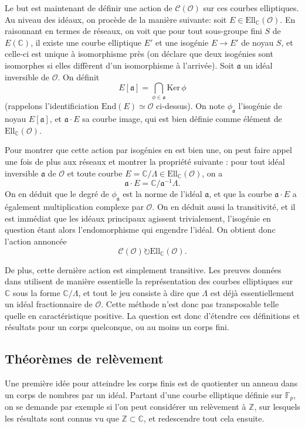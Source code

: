 \documentclass[11pt,a4paper]{article}
\newcommand{\Z}{\mathbb{Z}}
\newcommand{\C}{\mathbb{C}}
\newcommand{\F}{\mathbb{F}}
\renewcommand{\O}{\mathcal{O}}
\newcommand{\Cl}{\mathcal{C}}
\newcommand{\vers}{\longrightarrow}
\newcommand{\End}{\mathrm{End}}
\newcommand{\Ell}{\mathrm{Ell}}
\renewcommand{\frak}{\mathfrak}
\renewcommand{\v}{\vspace{5mm}}
\theoremstyle{definition}
\begin{document}
Le but est maintenant de définir une action de $\Cl(\O)$ sur ces courbes elliptiques. Au niveau des idéaux, on procède de la manière suivante: soit $E\in \Ell_\C(\O)$. En raisonnant en termes de réseaux, on voit que pour tout sous-groupe fini $S$ de $E(\C)$, il existe une courbe elliptique $E'$ et une isogénie $E\vers E'$ de noyau $S$, et celle-ci est unique à isomorphisme près (on déclare que deux isogénies sont isomorphes si elles diffèrent d'un isomorphisme à l'arrivée). Soit $\frak a$ un idéal inversible de $\O$. On définit
$$E[\frak a]=\bigcap_{\phi\in \frak a} \mathrm{Ker}\,\phi$$
(rappelons l'identificiation $\End(E)\simeq\O$ ci-dessus). On note $\phi_{\frak a}$ l'isogénie de noyau $E[\frak a]$, et $\frak a\cdot E$ sa courbe image, qui est bien définie comme élément de $\Ell_\C(\O)$.

\v

Pour montrer que cette action par isogénies en est bien une, on peut faire appel une fois de plus aux réseaux et montrer la propriété suivante : pour tout idéal inversible $\frak a$ de $\O$ et toute courbe $E=\C/\Lambda\in \Ell_\C(\O)$, on a
$$\frak a\cdot E = \C/\frak a^{-1} \Lambda.$$
On en déduit que le degré de $\phi_{\frak a}$ est la norme de l'idéal $\frak a$, et que la courbe $\frak a\cdot E$ a également multiplication complexe par $\O$. On en déduit aussi la transitivité, et il est immédiat que les idéaux principaux agissent trivialement, l'isogénie en question étant alors l'endomorphisme qui engendre l'idéal. On obtient donc l'action annoncée
$$\Cl(\O) \circlearrowright \Ell_\C(\O).$$

De plus, cette dernière action est simplement transitive. Les preuves données dans \cite{Sil2} utilisent de manière essentielle la représentation des courbes elliptiques sur $\C$ sous la forme $\C/\Lambda$, et tout le jeu consiste à dire que $\Lambda$ est déjà essentiellement un idéal fractionnaire de $\O$. Cette méthode n'est donc pas transposable telle quelle en caractéristique positive. La question est donc d'étendre ces définitions et résultats pour un corps quelconque, ou au moins un corps fini.

\subsection{Théorèmes de relèvement}

Une première idée pour atteindre les corps finis est de quotienter un anneau dans un corps de nombres par un idéal. Partant d'une courbe elliptique définie sur $\F_p$, on se demande par exemple si l'on peut considérer un relèvement à $\Z$, sur lesquels les résultats sont connus vu que $\Z\subset\C$, et redescendre tout cela ensuite. 
\end{document}
